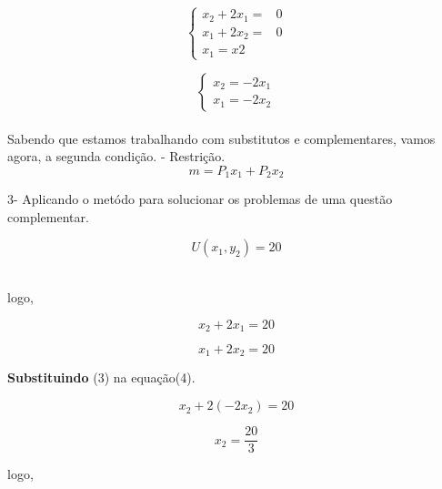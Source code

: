 \begin{flushleft}
	\begin{equation}
	\left\{
	\begin{array}{ccc}
	x_{2} + 2x_{1} = & 0 \\
	x_{1} + 2x_{2} = & 0 \\
	x_{1} = x{2} 
	\end{array}
	\right.
	\end{equation}

	\begin{equation}
		\left\{
		\begin{array}{ll}
		x_{2} = - 2x_{1} \\
		x_{1} = - 2x_{2}
		\end{array}
		\right.
		\end{equation}\\

   Sabendo que estamos trabalhando com substitutos e complementares, vamos agora, a segunda condição.
   - Restrição.
   \\
   $$m = P_{1}x_{1} + P_{2}x_{2}$$ 
   \singlespacing

   3- Aplicando o metódo para solucionar os problemas de uma questão complementar.
		
			$$U(x_{1}, y_{2}) = 20$$ \\
		\begin{center}
			
		logo, \\
		\end{center}

		\begin{equation} \label{eq:2}
		{x_{2} + 2x_{1} = 20} 
		\end{equation}

		\begin{equation}
			{x_{1} + 2x_{2} = 20} \label{eq:3}
		\end{equation}
		\begin{center}
			\textbf{Substituindo} (3) na equação(4).
		\end{center}
		
		\begin{equation} \label{eq:4}
		{x_{2} + 2(-2x_{2}) = 20}
		\end{equation}
		
		\begin{equation} \label{eq:5}
			{x_{2} = \dfrac{20}{3}}
		\end{equation}
		
		\begin{center}
			logo, \\
		\end{center}
		

\end{flushleft}
